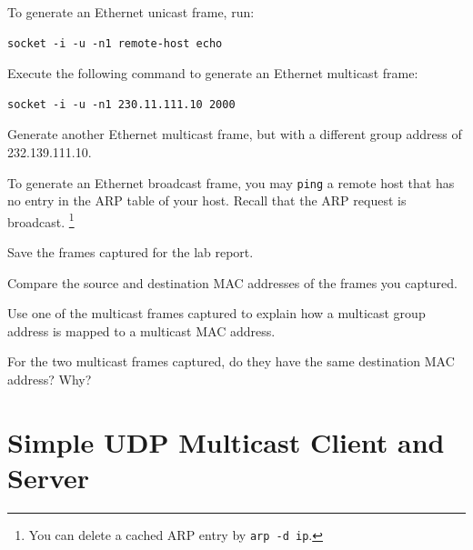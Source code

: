 \documentclass{../UTNetLab}
\begin{document}
    To generate an Ethernet unicast frame, run:
    \begin{lstlisting}[emph={your-host, remote-host}]
socket -i -u -n1 remote-host echo
    \end{lstlisting}

    Execute the following command to generate an Ethernet multicast frame:
    \begin{lstlisting}[emph={your-host, remote-host}]
socket -i -u -n1 230.11.111.10 2000
    \end{lstlisting}

    Generate another Ethernet multicast frame, but with a different group address of {232.139.111.10}.

    To generate an Ethernet broadcast frame, you may \lstinline{ping} a remote host that has no entry in the ARP table of your host.
    Recall that the ARP request is broadcast.%
    \footnote{You can delete a cached ARP entry by \lstinline[emph={ip}]{arp -d ip}.}

    Save the frames captured for the lab report.

    \begin{report}
    \item Compare the source and destination MAC addresses of the frames you captured.

    \item Use one of the multicast frames captured to explain how a multicast group address is mapped to a multicast MAC address.

    For the two multicast frames captured, do they have the same destination MAC address?
    Why?
    \end{report}

\section{Simple UDP Multicast Client and Server}

    
    
\end{document}
